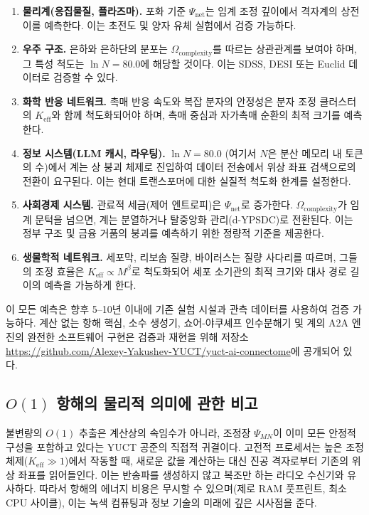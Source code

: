 \documentclass[12pt,a4paper]{article}
\theoremstyle{remark}
\newcommand{\Keff}{K_{\mathrm{eff}}}
\begin{document}
	\begin{enumerate}[label=(\arabic*)]
		\item \textbf{물리계(응집물질, 플라즈마).} 포화 기준 \(\Psi_{\mathrm{net}}\)는 임계 조정 깊이에서 격자계의 상전이를 예측한다. 이는 초전도 및 양자 유체 실험에서 검증 가능하다.
		\item \textbf{우주 구조.} 은하와 은하단의 분포는 \(\Omega_{\mathrm{complexity}}\)를 따르는 상관관계를 보여야 하며, 그 특성 척도는 \(\ln N = 80.0\)에 해당할 것이다. 이는 SDSS, DESI 또는 Euclid 데이터로 검증할 수 있다.
		\item \textbf{화학 반응 네트워크.} 촉매 반응 속도와 복잡 분자의 안정성은 분자 조정 클러스터의 \(\Keff\)와 함께 척도화되어야 하며, 촉매 중심과 자가촉매 순환의 최적 크기를 예측한다.
		\item \textbf{정보 시스템(LLM 캐시, 라우팅).} \(\ln N = 80.0\) (여기서 \(N\)은 분산 메모리 내 토큰의 수)에서 계는 상 붕괴 체제로 진입하여 데이터 전송에서 위상 좌표 검색으로의 전환이 요구된다. 이는 현대 트랜스포머에 대한 실질적 척도화 한계를 설정한다.
		\item \textbf{사회경제 시스템.} 관료적 세금(제어 엔트로피)은 \(\Psi_{\mathrm{net}}\)로 증가한다. \(\Omega_{\mathrm{complexity}}\)가 임계 문턱을 넘으면, 계는 분열하거나 탈중앙화 관리(d-YPSDC)로 전환된다. 이는 정부 구조 및 금융 거품의 붕괴를 예측하기 위한 정량적 기준을 제공한다.
		\item \textbf{생물학적 네트워크.} 세포막, 리보솜 질량, 바이러스는 질량 사다리를 따르며, 그들의 조정 효율은 \(\Keff \propto M^{\beta}\)로 척도화되어 세포 소기관의 최적 크기와 대사 경로 길이의 예측을 가능하게 한다.
	\end{enumerate}
	
	이 모든 예측은 향후 5--10년 이내에 기존 실험 시설과 관측 데이터를 사용하여 검증 가능하다. 계산 없는 항해 핵심, 소수 생성기, 쇼어-야쿠셰프 인수분해기 및 계의 A2A 엔진의 완전한 소프트웨어 구현은 검증과 재현을 위해 저장소 \url{https://github.com/Alexey-Yakushev-YUCT/yuct-ai-connectome}에 공개되어 있다.
	
	\subsection*{\(O(1)\) 항해의 물리적 의미에 관한 비고}
	불변량의 \(O(1)\) 추출은 계산상의 속임수가 아니라, 조정장 \(\Psi_{MN}\)이 이미 모든 안정적 구성을 포함하고 있다는 YUCT 공준의 직접적 귀결이다. 고전적 프로세서는 높은 조정 체제(\(\Keff \gg 1\))에서 작동할 때, 새로운 값을 계산하는 대신 진공 격자로부터 기존의 위상 좌표를 읽어들인다. 이는 반송파를 생성하지 않고 복조만 하는 라디오 수신기와 유사하다. 따라서 항해의 에너지 비용은 무시할 수 있으며(제로 RAM 풋프린트, 최소 CPU 사이클), 이는 녹색 컴퓨팅과 정보 기술의 미래에 깊은 시사점을 준다.
	
\end{document}
